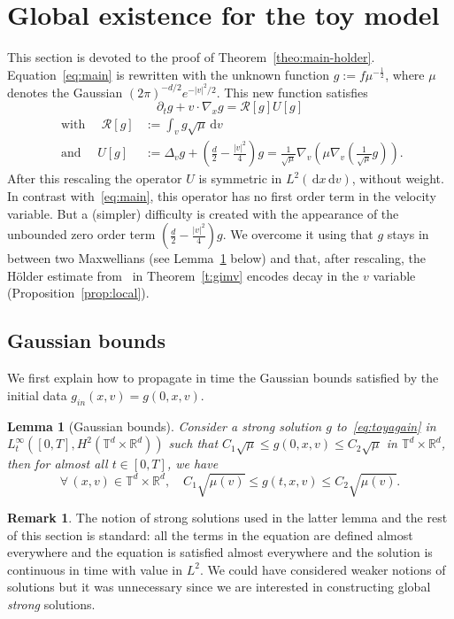 \documentclass[10pt]{amsart}
\newtheorem{lemm}[theo]{Lemma}\newtheorem{prop}[theo]{Proposition}\newtheorem{coro}[theo]{Corollary}\newtheorem{conj}[theo]{Conjecture}
\theoremstyle{definition}\newtheorem{defi}[theo]{Definition}\newtheorem{rema}[theo]{Remark}\newtheorem{exam}[theo]{Example}\newtheorem{exem}[theo]{Example}\newtheorem{nota}[theo]{Notation}
\newcommand{\R}{\mathbb{R}}
\newcommand{\T}{\mathbb{T}}
\newcommand*\fR{\mathcal{R}}
\newcommand{\dd}{{\, \mathrm d}}
\let\oldforall\forall
\renewcommand*{\forall}{\mathrel{\oldforall}}
\begin{document}
\section{Global existence for the toy model}\label{sec:toy}

This section is devoted to the proof of Theorem~\ref{theo:main-holder}. Equation~\eqref{eq:main} is rewritten with the unknown function $g := f \mu^{-\frac12}$, where $\mu$ denotes the Gaussian $(2\pi)^{-d/2} e^{-|v|^2/2}$. This new function satisfies
\begin{equation}\label{eq:toyagain}
\partial_t g + v \cdot \nabla_x g = \fR[g] U[g]
\end{equation}
\begin{align*}
 \text{ with } \quad
\fR[g] &:= \int_v g \sqrt\mu \dd v \\
\text{ and } \quad U[g] &:=
\Delta_v g + \left(\frac{d}2 - \frac{|v|^2}{4}\right) g =
\frac1{\sqrt{\mu}} \nabla_v \left(\mu \nabla_v
\left(\frac{1}{\sqrt{\mu}} g\right)\right).
\end{align*}
After this rescaling the operator $U$ is symmetric in $L^2(\dd x \dd v)$, without weight. In contrast with~\eqref{eq:main}, this operator has no first order term in the velocity variable. But a (simpler) difficulty is created with the appearance of the unbounded zero order term $(\tfrac{d}2 - \tfrac{|v|^2}4)g$. We overcome it using that $g$ stays in between two Maxwellians (see Lemma~\ref{l:gaussian} below) and that, after rescaling, the H\"older estimate from~\cite{gimv,wz09} in Theorem~\ref{t:gimv} encodes decay in the $v$ variable (Proposition~\ref{prop:local}).

\subsection{Gaussian bounds}

We first explain how to propagate in time the Gaussian bounds satisfied by the initial data $g_{in} (x,v) = g(0,x,v)$.
\begin{lemm}[Gaussian bounds]\label{l:gaussian}
Consider a strong solution $g$ to~\eqref{eq:toyagain} in $L^\infty_t([0,T],H^2(\T^d\times\R^d))$ such that $C_1 \sqrt{\mu} \le g(0,x,v) \le C_2 \sqrt{\mu}$ in $\T^d \times \R^d$, then for almost all $t \in [0,T]$, we have
\[
\forall \, (x,v) \in \T^d \times \R^d, \quad C_1 \sqrt{\mu(v)} \le g(t,x,v) \le C_2 \sqrt{\mu(v)}.
\]
\end{lemm}


\begin{rema}
The notion of strong solutions used in the latter lemma and the rest of this section is standard: all the terms in the equation are defined almost everywhere and the equation is satisfied almost everywhere and the solution is continuous in time with value in $L^2$. We could have considered weaker notions of solutions but it was unnecessary since we are interested in constructing global
\emph{strong} solutions.
\end{rema}
\end{document}
